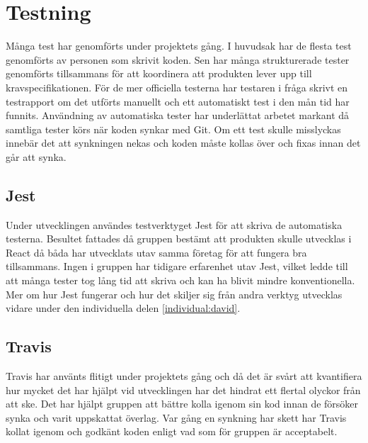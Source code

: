 \section{Testning}
Många test har genomförts under projektets gång. I huvudsak har de flesta test genomförts av personen som skrivit koden. Sen har många strukturerade tester genomförts tillsammans för att koordinera att produkten lever upp till kravspecifikationen. För de mer officiella testerna har testaren i fråga skrivt en testrapport om det utförts manuellt och ett automatiskt test i den mån tid har funnits. Användning av automatiska tester har underlättat arbetet markant då samtliga tester körs när koden synkar med Git. Om ett test skulle misslyckas innebär det att synkningen nekas och koden måste kollas över och fixas innan det går att synka.
\subsection{Jest}
Under utvecklingen användes testverktyget Jest för att skriva de automatiska testerna. Besultet fattades då gruppen bestämt att produkten skulle utvecklas i React då båda har utvecklats utav samma företag för att fungera bra tillsammans. Ingen i gruppen har tidigare erfarenhet utav Jest, vilket ledde till att många tester tog lång tid att skriva och kan ha blivit mindre konventionella. Mer om hur Jest fungerar och hur det skiljer sig från andra verktyg utvecklas vidare under den individuella delen \ref{individual:david}.
\subsection{Travis}
Travis har använts flitigt under projektets gång och då det är svårt att kvantifiera hur mycket det har hjälpt vid utvecklingen har det hindrat ett flertal olyckor från att ske. Det har hjälpt gruppen att bättre kolla igenom sin kod innan de försöker synka och varit uppskattat överlag. Var gång en synkning har skett har Travis kollat igenom och godkänt koden enligt vad som för gruppen är acceptabelt. 